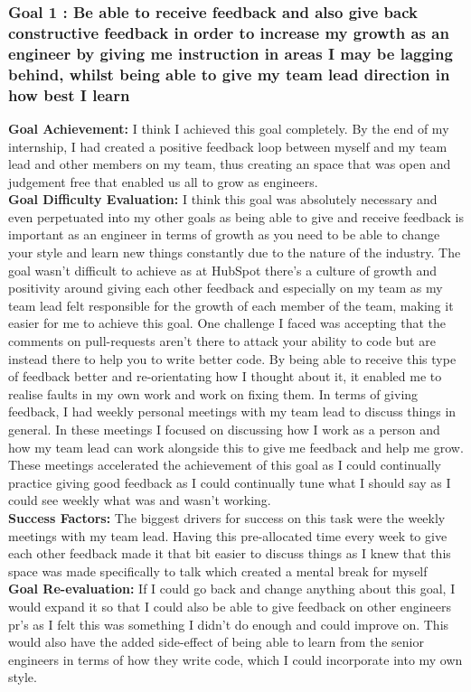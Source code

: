\subsubsection*{Goal 1 : Be able to receive feedback and also give back constructive feedback in order to increase my growth as an engineer by giving me instruction in areas I may be lagging behind, whilst being able to give my team lead direction in how best I learn}
\textbf{Goal Achievement: } I think I achieved this goal completely.  By the end of my internship,  I had created a positive feedback loop between myself and my team lead and other members on my team,  thus creating an space that was open and judgement free that enabled us all to grow as engineers. \\
\textbf{Goal Difficulty Evaluation:} I think this goal was absolutely necessary and even perpetuated into my other goals as being able to give and receive feedback is important as an engineer in terms of growth as you need to be able to change your style and learn new things constantly due to the nature of the industry.  The goal wasn't difficult to achieve as at HubSpot there's a culture of growth and positivity around giving each other feedback and especially on my team as my team lead felt responsible for the growth of each member of the team, making it easier for me to achieve this goal.  One challenge I faced was accepting that the comments on pull-requests aren't there to attack your ability to code but are instead there to help you to write better code.  By being able to receive this type of feedback better and re-orientating how I thought about it,  it enabled me to realise faults in my own work and work on fixing them.  In terms of giving feedback,  I had weekly personal meetings with my team lead to discuss things in general.  In these meetings I focused on discussing how I work as a person and how my team lead can work alongside this to give me feedback and help me grow.  These meetings accelerated the achievement of this goal as I could continually practice giving good feedback as I could continually tune what I should say as I could see weekly what was and wasn't working.  \\  
\textbf{Success Factors:} The biggest drivers for success on this task were the weekly meetings with my team lead.  Having this pre-allocated time every week to give each other feedback made it that bit easier to discuss things as I knew that this space was made specifically to talk which created a mental break for myself \\
\textbf{Goal Re-evaluation:} If I could go back and change anything about this goal,  I would expand it so that I could also be able to give feedback on other engineers pr's as I felt this was something I didn't do enough and could improve on.  This would also have the added side-effect of being able to learn from the senior engineers in terms of how they write code,  which I could incorporate into my own style. 


